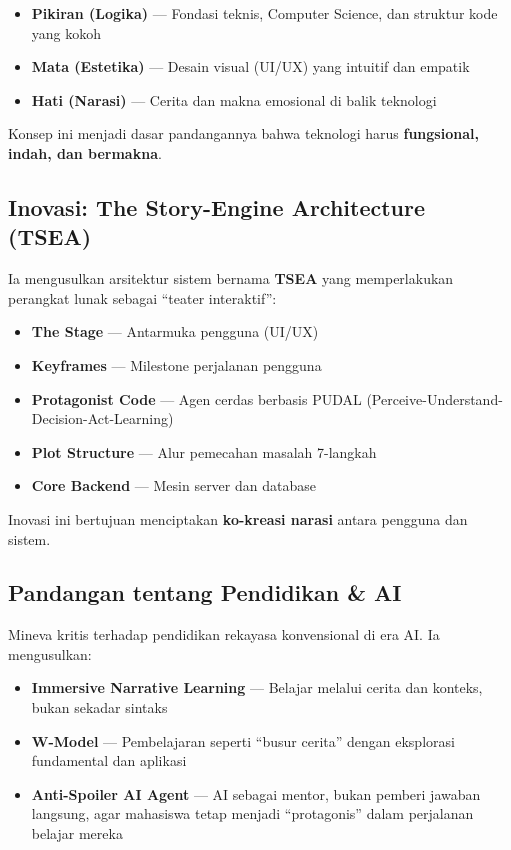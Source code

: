 \documentclass[
  letterpaper,
  DIV=11,
  numbers=noendperiod]{scrreprt}
\providecommand{\tightlist}{%
  \setlength{\itemsep}{0pt}\setlength{\parskip}{0pt}}
\begin{document}
\begin{itemize}
\tightlist
\item
  \textbf{Pikiran (Logika)} --- Fondasi teknis, Computer Science, dan
  struktur kode yang kokoh
\item
  \textbf{Mata (Estetika)} --- Desain visual (UI/UX) yang intuitif dan
  empatik
\item
  \textbf{Hati (Narasi)} --- Cerita dan makna emosional di balik
  teknologi
\end{itemize}

Konsep ini menjadi dasar pandangannya bahwa teknologi harus
\textbf{fungsional, indah, dan bermakna}.

\subsection{\texorpdfstring{\textbf{Inovasi: The Story-Engine
Architecture
(TSEA)}}{Inovasi: The Story-Engine Architecture (TSEA)}}\label{inovasi-the-story-engine-architecture-tsea}

Ia mengusulkan arsitektur sistem bernama \textbf{TSEA} yang
memperlakukan perangkat lunak sebagai ``teater interaktif'':

\begin{itemize}
\tightlist
\item
  \textbf{The Stage} --- Antarmuka pengguna (UI/UX)
\item
  \textbf{Keyframes} --- Milestone perjalanan pengguna
\item
  \textbf{Protagonist Code} --- Agen cerdas berbasis PUDAL
  (Perceive-Understand-Decision-Act-Learning)
\item
  \textbf{Plot Structure} --- Alur pemecahan masalah 7-langkah
\item
  \textbf{Core Backend} --- Mesin server dan database
\end{itemize}

Inovasi ini bertujuan menciptakan \textbf{ko-kreasi narasi} antara
pengguna dan sistem.

\subsection{\texorpdfstring{\textbf{Pandangan tentang Pendidikan \&
AI}}{Pandangan tentang Pendidikan \& AI}}\label{pandangan-tentang-pendidikan-ai}

Mineva kritis terhadap pendidikan rekayasa konvensional di era AI. Ia
mengusulkan:

\begin{itemize}
\tightlist
\item
  \textbf{Immersive Narrative Learning} --- Belajar melalui cerita dan
  konteks, bukan sekadar sintaks
\item
  \textbf{W-Model} --- Pembelajaran seperti ``busur cerita'' dengan
  eksplorasi fundamental dan aplikasi
\item
  \textbf{Anti-Spoiler AI Agent} --- AI sebagai mentor, bukan pemberi
  jawaban langsung, agar mahasiswa tetap menjadi ``protagonis'' dalam
  perjalanan belajar mereka
\end{itemize}
\end{document}
